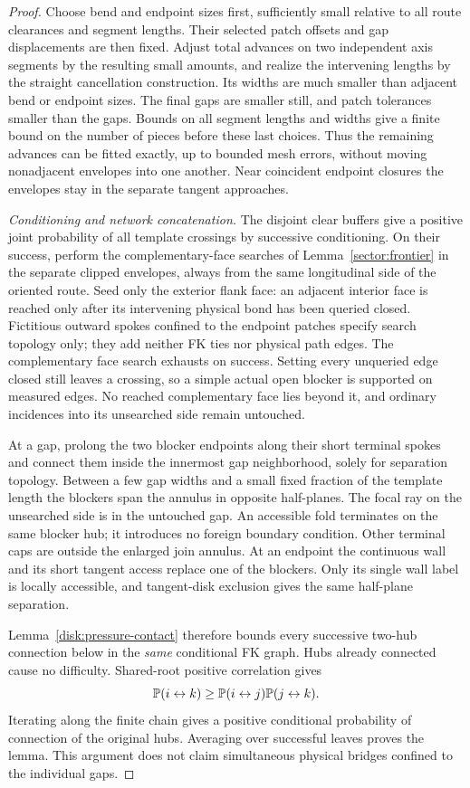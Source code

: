 \begin{proof}
Choose bend and endpoint sizes first, sufficiently small
relative to all route clearances and segment lengths.
Their selected patch offsets and gap displacements are
then fixed.  Adjust total advances on two independent
axis segments by the resulting small amounts, and realize
the intervening lengths by the straight cancellation
construction.  Its widths are much smaller than adjacent
bend or endpoint sizes.  The final gaps are smaller still,
and patch tolerances smaller than the gaps.  Bounds on all
segment lengths and widths give a finite bound on the
number of pieces before these last choices.  Thus the
remaining advances can be fitted exactly, up to bounded
mesh errors, without moving nonadjacent envelopes into
one another.  Near coincident endpoint closures the
envelopes stay in the separate tangent approaches.

\emph{Conditioning and network concatenation.}
The disjoint clear buffers give a positive joint probability
of all template crossings by successive conditioning.
On their success, perform the complementary-face searches of
Lemma~\ref{sector:frontier} in the separate clipped envelopes, always
from the same longitudinal side of the oriented route.  Seed only
the exterior flank face: an adjacent interior face is reached only
after its intervening physical bond has been queried closed.
Fictitious outward spokes confined to the endpoint patches specify
search topology only; they add neither FK ties nor physical path edges.
The complementary face search exhausts on success.  Setting every unqueried edge closed still leaves
a crossing, so a simple actual open blocker is supported
on measured edges.  No reached complementary face lies
beyond it, and ordinary incidences into its unsearched
side remain untouched.

At a gap, prolong the two blocker endpoints along their
short terminal spokes and connect them inside the innermost
gap neighborhood, solely for separation topology.  Between
a few gap widths and a small fixed fraction of the template
length the blockers span the annulus in opposite half-planes.
The focal ray on the unsearched side is in the untouched
gap.  An accessible fold terminates on the same blocker
hub; it introduces no foreign boundary condition.  Other
terminal caps are outside the enlarged join annulus.
At an endpoint the continuous wall and its short tangent
access replace one of the blockers.  Only its single wall
label is locally accessible, and tangent-disk exclusion
gives the same half-plane separation.

Lemma~\ref{disk:pressure-contact} therefore bounds every
successive two-hub connection below in the \emph{same}
conditional FK graph.  Hubs already connected cause no
difficulty.  Shared-root positive correlation gives
\[
 \mathbb P(i\leftrightarrow k)
 \ge
 \mathbb P(i\leftrightarrow j)\mathbb P(j\leftrightarrow k).
\]
Iterating along the finite chain gives a positive conditional
probability of connection of the original hubs.  Averaging
over successful leaves proves the lemma.  This argument
does not claim simultaneous physical bridges confined
to the individual gaps.
\end{proof}

